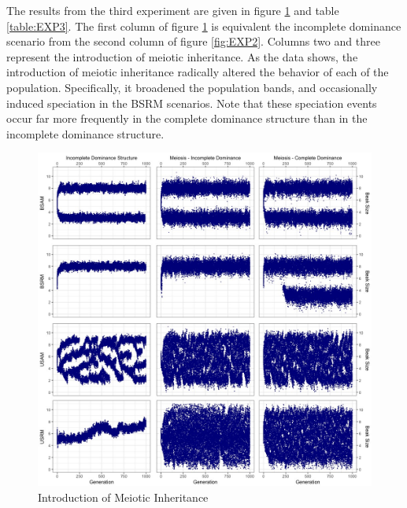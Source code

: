 \documentclass{article}
\begin{document}
The results from the third experiment are given in figure \ref{fig:EXP3} and table \ref{table:EXP3}. The first column of figure \ref{fig:EXP3} is equivalent the incomplete dominance scenario from the second column of figure \ref{fig:EXP2}. Columns two and three represent the introduction of meiotic inheritance. As the data shows, the introduction of meiotic inheritance radically altered the behavior of each of the population. Specifically, it broadened the population bands, and occasionally induced speciation in the BSRM scenarios. Note that these speciation events occur far more frequently in the complete dominance structure than in the incomplete dominance structure.

\begin{figure} [ht!]
    \centering
    \includegraphics[width=\linewidth]{Data/EXP3}
    \caption{Introduction of Meiotic Inheritance}
    \label{fig:EXP3}
\end{figure}
\end{document}

